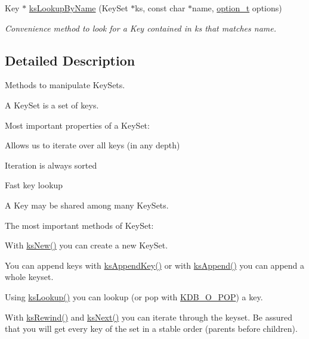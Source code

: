 \begin{DoxyCompactItemize}
Key $\ast$ \mbox{\hyperlink{group__keyset_gad2e30fb6d4739d917c5abb2ac2f9c1a1}{ks\+Lookup\+By\+Name}} (Key\+Set $\ast$ks, const char $\ast$name, \mbox{\hyperlink{group__keyset_ga98a3d6a4016c9dad9cbd1a99a9c2a45a}{option\+\_\+t}} options)
\begin{DoxyCompactList}\small\item\em Convenience method to look for a Key contained in {\ttfamily ks} that matches {\ttfamily name}. \end{DoxyCompactList}\end{DoxyCompactItemize}


\subsection{Detailed Description}
Methods to manipulate Key\+Sets. 

A Key\+Set is a set of keys.

Most important properties of a Key\+Set\+:


\begin{DoxyItemize}
\item Allows us to iterate over all keys (in any depth)
\item Iteration is always sorted
\item Fast key lookup
\item A Key may be shared among many Key\+Sets.
\end{DoxyItemize}

The most important methods of Key\+Set\+:


\begin{DoxyItemize}
\item With \mbox{\hyperlink{group__keyset_ga671e1aaee3ae9dc13b4834a4ddbd2c3c}{ks\+New()}} you can create a new Key\+Set.
\item You can append keys with \mbox{\hyperlink{group__keyset_gaa5a1d467a4d71041edce68ea7748ce45}{ks\+Append\+Key()}} or with \mbox{\hyperlink{group__keyset_ga21eb9c3a14a604ee3a8bdc779232e7b7}{ks\+Append()}} you can append a whole keyset.
\item Using \mbox{\hyperlink{group__keyset_gaa34fc43a081e6b01e4120daa6c112004}{ks\+Lookup()}} you can lookup (or pop with \mbox{\hyperlink{group__keyset_gga98a3d6a4016c9dad9cbd1a99a9c2a45aa52fb5f2cc86773d393da62bebebf7984}{K\+D\+B\+\_\+\+O\+\_\+\+P\+OP}}) a key.
\item With \mbox{\hyperlink{group__keyset_gabe793ff51f1728e3429c84a8a9086b70}{ks\+Rewind()}} and \mbox{\hyperlink{group__keyset_ga317321c9065b5a4b3e33fe1c399bcec9}{ks\+Next()}} you can iterate through the keyset. Be assured that you will get every key of the set in a stable order (parents before children).
\end{DoxyItemize}

